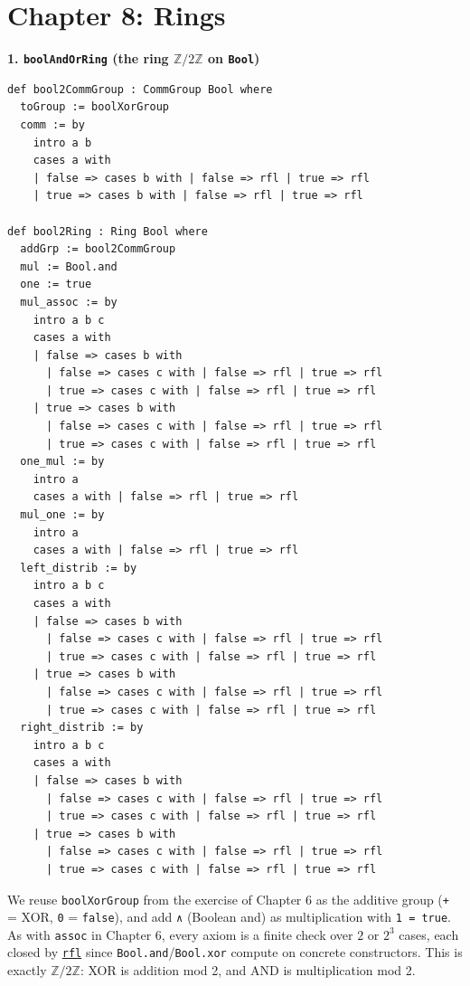 \section{Chapter 8: Rings}\label{sec:14-appendix-solutions:07-chapter-8:1}

\textbf{1. \texttt{boolAndOrRing} (the ring \(\mathbb{Z}/2\mathbb{Z}\) on \texttt{Bool})}

\begin{lstlisting}
def bool2CommGroup : CommGroup Bool where
  toGroup := boolXorGroup
  comm := by
    intro a b
    cases a with
    | false => cases b with | false => rfl | true => rfl
    | true => cases b with | false => rfl | true => rfl

def bool2Ring : Ring Bool where
  addGrp := bool2CommGroup
  mul := Bool.and
  one := true
  mul_assoc := by
    intro a b c
    cases a with
    | false => cases b with
      | false => cases c with | false => rfl | true => rfl
      | true => cases c with | false => rfl | true => rfl
    | true => cases b with
      | false => cases c with | false => rfl | true => rfl
      | true => cases c with | false => rfl | true => rfl
  one_mul := by
    intro a
    cases a with | false => rfl | true => rfl
  mul_one := by
    intro a
    cases a with | false => rfl | true => rfl
  left_distrib := by
    intro a b c
    cases a with
    | false => cases b with
      | false => cases c with | false => rfl | true => rfl
      | true => cases c with | false => rfl | true => rfl
    | true => cases b with
      | false => cases c with | false => rfl | true => rfl
      | true => cases c with | false => rfl | true => rfl
  right_distrib := by
    intro a b c
    cases a with
    | false => cases b with
      | false => cases c with | false => rfl | true => rfl
      | true => cases c with | false => rfl | true => rfl
    | true => cases b with
      | false => cases c with | false => rfl | true => rfl
      | true => cases c with | false => rfl | true => rfl
\end{lstlisting}

We reuse \texttt{boolXorGroup} from the exercise of Chapter 6 as the additive group (\texttt{+} = XOR, \texttt{0} = \texttt{false}), and add \texttt{∧} (Boolean and) as multiplication with \texttt{1 = true}. As with \texttt{assoc} in Chapter 6, every axiom is a finite check over \(2\) or \(2^3\) cases, each closed by \href{https://lean-lang.org/doc/reference/latest/Tactic-Proofs/Tactic-Reference/}{\texttt{rfl}} since \texttt{Bool.and}/\texttt{Bool.xor} compute on concrete constructors. This is exactly \(\mathbb{Z}/2\mathbb{Z}\): XOR is addition mod 2, and AND is multiplication mod 2.

